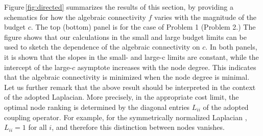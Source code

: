 \documentclass[%
 reprint,
 amsmath,amssymb,
 aip,
]{revtex4-2}
\theoremstyle{italichead}
\theoremstyle{definition}
\begin{document}
{%



Figure\,\ref{fig:directed} summarizes the results of this section, by providing a schematics for how the algebraic connectivity $f$ varies with the magnitude of the budget $c$. 
The top (bottom) panel is for the case of Problem 1 (Problem 2.) 
{The figure shows that our calculations in the small and large budget limits can be used to sketch the dependence of the algebraic connectivity on $c$. In both panels, it is shown that the slopes in the small- and large-c limits are constant, while the intercept of the large-$c$ asymptote increases with the node degree. This indicates that the algebraic connectivity is minimized when the node degree is minimal.} {Let us further remark that the above result should be interpreted in the context of the adopted Laplacian. More precisely, in the appropriate cost limit, the optimal node ranking is determined by the diagonal entries $L_{ii}$ of the adopted coupling operator. For example, for the symmetrically normalized Laplacian \cite{chung1997spectral}, $L_{ii}=1$ for all $i$, and therefore this distinction between nodes vanishes.}







}
\end{document}
